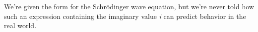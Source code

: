 We're given the form for the Schrödinger wave equation, but we're never told
how such an expression containing the imaginary value \textit{i} can predict
behavior in the real world.